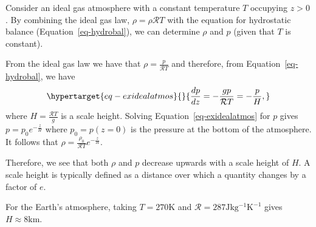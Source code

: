 \documentclass[
  letterpaper,
  twocolumn,
  landscape]{report}
\begin{document}
\begin{tcolorbox}[enhanced jigsaw, left=2mm, opacityback=0, coltitle=black, bottomtitle=1mm, title={Example}, toprule=.15mm, colbacktitle=quarto-callout-tip-color!10!white, breakable, arc=.35mm, titlerule=0mm, colback=white, toptitle=1mm, opacitybacktitle=0.6, rightrule=.15mm, bottomrule=.15mm, colframe=quarto-callout-tip-color-frame, leftrule=.75mm]

Consider an ideal gas atmosphere with a constant temperature \(T\)
occupying \(z>0\). By combining the ideal gas law,
\(\rho=\rho\mathcal{R}T\) with the equation for hydrostatic balance
(Equation~\ref{eq-hydrobal}), we can determine \(\rho\) and \(p\) (given
that \(T\) is constant).

From the ideal gas law we have that \(\rho=\frac{p}{\mathcal{R} T}\) and
therefore, from Equation~\ref{eq-hydrobal}, we have
\begin{equation}\protect\hypertarget{eq-exidealatmos}{}{
\frac{dp}{dz} = -\frac{gp}{\mathcal{R} T}=-\frac{p}{H}, 
}\label{eq-exidealatmos}\end{equation} where
\(H=\frac{\mathcal{R}T}{g}\) is a scale height. Solving
Equation~\ref{eq-exidealatmos} for \(p\) gives \(p=p_0e^{-\frac{z}{H}}\)
where \(p_0=p(z=0)\) is the pressure at the bottom of the atmosphere. It
follows that \(\rho=\frac{\rho_0}{\mathcal{R} T}e^{-\frac{z}{H}}\).

Therefore, we see that both \(\rho\) and \(p\) decrease upwards with a
scale height of \(H\). A scale height is typically defined as a distance
over which a quantity changes by a factor of \(e\).

For the Earth's atmosphere, taking \(T=270\mathrm{K}\) and
\(\mathcal{R}=287\mathrm{Jkg^{-1}K^{-1}}\) gives
\(H\approx 8\mathrm{km}\).

\end{tcolorbox}
\end{document}
